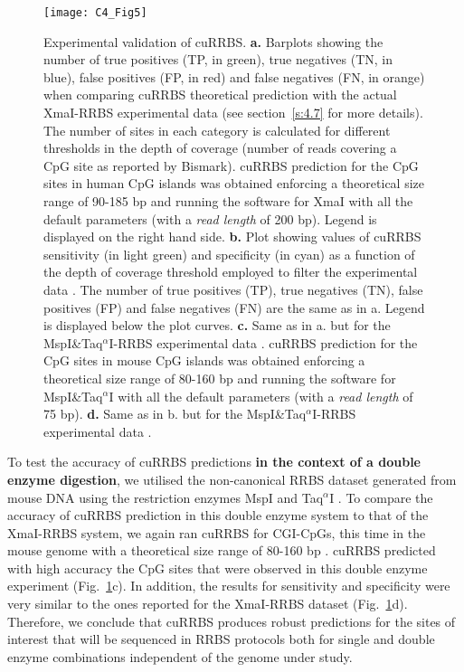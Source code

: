 \begin{figure}[htbp!] 
	\centering    
	\texttt{[image: C4\_Fig5]}
	\vspace*{2mm}
	\caption[Experimental validation of cuRRBS]{Experimental validation of cuRRBS. \textbf{a.} Barplots showing the number of true positives (\acrshort{TP}, in green), true negatives (\acrshort{TN}, in blue), false positives (\acrshort{FP}, in red) and false negatives (\acrshort{FN}, in orange) when comparing cuRRBS theoretical prediction with the actual XmaI-RRBS experimental data \citep{Tanas2017} (see section~\ref{s:4.7} for more details). The number of sites in each category is calculated for different thresholds in the depth of coverage (number of reads covering a CpG site as reported by Bismark). cuRRBS prediction for the CpG sites in human CpG islands was obtained enforcing a theoretical size range of 90-185 bp and running the software for XmaI with all the default parameters (with a \textit{read length} of 200 bp). Legend is displayed on the right hand side. \textbf{b.} Plot showing values of cuRRBS sensitivity (in light green) and specificity (in cyan) as a function of the depth of coverage threshold employed to filter the experimental data \citep{Tanas2017}. The number of true positives (TP), true negatives (TN), false positives (FP) and false negatives (FN) are the same as in a. Legend is displayed below the plot curves. \textbf{c.} Same as in a. but for the MspI\&Taq$^\alpha$I-RRBS experimental data \citep{Lim2016}. cuRRBS prediction for the CpG sites in mouse CpG islands was obtained enforcing a theoretical size range of 80-160 bp and running the software for MspI\&Taq$^\alpha$I with all the default parameters (with a \textit{read length} of 75 bp). \textbf{d.} Same as in b. but for the MspI\&Taq$^\alpha$I-RRBS experimental data \citep{Lim2016}.}
	\label{fig:c4_fig5}
\end{figure}

\bigskip

To test the accuracy of cuRRBS predictions \textbf{in the context of a double enzyme digestion}, we utilised the non-canonical RRBS dataset generated from mouse DNA using the restriction enzymes MspI and Taq$^\alpha$I \citep{Lim2016}. To compare the accuracy of cuRRBS prediction in this double enzyme system to that of the XmaI-RRBS system, we again ran cuRRBS for CGI-CpGs, this time in the mouse genome with a theoretical size range of 80-160 bp \citep{Lim2016}. cuRRBS predicted with high accuracy the CpG sites that were observed in this double enzyme experiment (Fig.~\ref{fig:c4_fig5}c). In addition, the results for sensitivity and specificity were very similar to the ones reported for the XmaI-RRBS dataset (Fig.~\ref{fig:c4_fig5}d). Therefore, we conclude that cuRRBS produces robust predictions for the sites of interest that will be sequenced in RRBS protocols both for single and double enzyme combinations independent of the genome under study.

